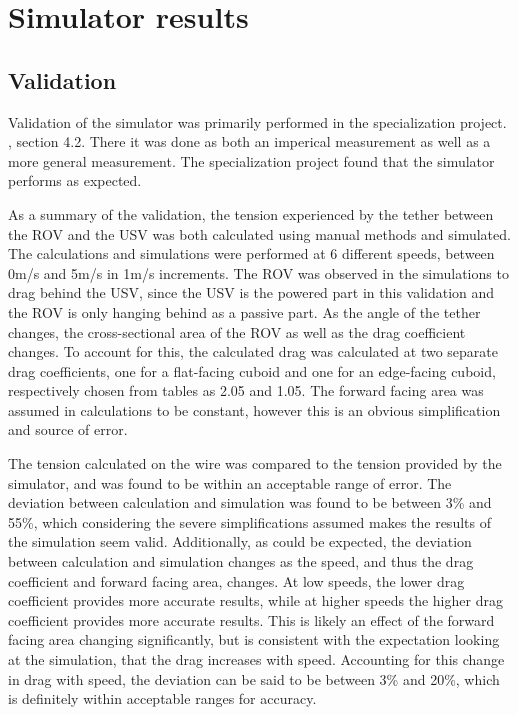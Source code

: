 \documentclass[class=article, crop=false]{standalone}
\begin{document}
\section{Simulator results}
\subsection{Validation}
Validation of the simulator was primarily performed in the specialization project. \cite{specialization}, section 4.2. There it was done as both an imperical measurement as well as a more general measurement. The specialization project found that the simulator performs as expected.

As a summary of the validation, the tension experienced by the tether between the ROV and the USV was both calculated using manual methods and simulated. The calculations and simulations were performed at 6 different speeds, between 0m/s and 5m/s in 1m/s increments. The ROV was observed in the simulations to drag behind the USV, since the USV is the powered part in this validation and the ROV is only hanging behind as a passive part. As the angle of the tether changes, the cross-sectional area of the ROV as well as the drag coefficient changes. To account for this, the calculated drag was calculated at two separate drag coefficients, one for a flat-facing cuboid and one for an edge-facing cuboid, respectively chosen from tables as 2.05 and 1.05. The forward facing area was assumed in calculations to be constant, however this is an obvious simplification and source of error.

The tension calculated on the wire was compared to the tension provided by the simulator, and was found to be within an acceptable range of error. The deviation between calculation and simulation was found to be between 3\% and 55\%, which considering the severe simplifications assumed makes the results of the simulation seem valid. Additionally, as could be expected, the deviation between calculation and simulation changes as the speed, and thus the drag coefficient and forward facing area, changes. At low speeds, the lower drag coefficient provides more accurate results, while at higher speeds the higher drag coefficient provides more accurate results. This is likely an effect of the forward facing area changing significantly, but is consistent with the expectation looking at the simulation, that the drag increases with speed. Accounting for this change in drag with speed, the deviation can be said to be between 3\% and 20\%, which is definitely within acceptable ranges for accuracy.
\end{document}
